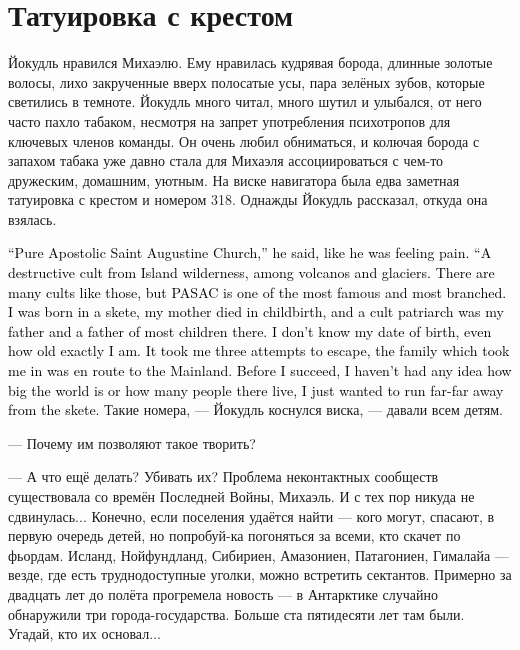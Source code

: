 \documentclass[a4paper,10pt,fleqn]{book}\usepackage{polyglossia}\setdefaultlanguage{english}\setotherlanguage{russian}\defaultfontfeatures{Ligatures=TeX,Mapping=tex-text}\usepackage{xcolor}\definecolor{lightgray}{HTML}{bbbbbb}\color{lightgray}\newcommand{\ml}[3]{\textcolor{black}{#3}}
\begin{document}
\section{Татуировка с крестом}

Йокудль нравился Михаэлю.
Ему нравилась кудрявая борода, длинные золотые волосы, лихо закрученные вверх полосатые усы, пара зелёных зубов, которые светились в темноте.
Йокудль много читал, много шутил и улыбался, от него часто пахло табаком, несмотря на запрет употребления психотропов для ключевых членов команды.
Он очень любил обниматься, и колючая борода с запахом табака уже давно стала для Михаэля ассоциироваться с чем-то дружеским, домашним, уютным.
На виске навигатора была едва заметная татуировка с крестом и номером 318.
Однажды Йокудль рассказал, откуда она взялась.

\ml{$0$}
{--- Чистоапостольская Церковь Святого Августина, --- сказал он, поморщившись, словно от боли.}
{``Pure Apostolic Saint Augustine Church,'' he said, like he was feeling pain.}
\ml{$0$}
{--- Деструктивный культ в дикой местности Исланда, среди вулканов и ледников.}
{``A destructive cult from Island wilderness, among volcanos and glaciers.}
\ml{$0$}
{Таких культов достаточно много, но ЧАСАЦ --- один из самых известных и разветвлённых.}
{There are many cults like those, but PASAC is one of the most famous and most branched.}
\ml{$0$}
{Я родился в ските, моя мать умерла при родах, а биологическим отцом был глава культа, как и у большинства родившихся там.}
{I was born in a skete, my mother died in childbirth, and a cult patriarch was my father and a father of most children there.}
\ml{$0$}
{Я не знаю, когда я родился и сколько мне в точности лет.}
{I don't know my date of birth, even how old exactly I am.}
\ml{$0$}
{Сбежал с третьей попытки --- меня приютила семья, которая направлялась на Большую Землю.}
{It took me three attempts to escape, the family which took me in was en route to the Mainland.}
\ml{$0$}
{До побега я даже не знал, что вне поселения есть целый мир и множество людей, я просто хотел убежать подальше от скита.}
{Before I succeed, I haven't had any idea how big the world is or how many people there live, I just wanted to run far-far away from the skete.}
Такие номера, --- Йокудль коснулся виска, --- давали всем детям.

--- Почему им позволяют такое творить?

--- А что ещё делать?
Убивать их?
Проблема неконтактных сообществ существовала со времён Последней Войны, Михаэль.
И с тех пор никуда не сдвинулась...
Конечно, если поселения удаётся найти --- кого могут, спасают, в первую очередь детей, но попробуй-ка погоняться за всеми, кто скачет по фьордам.
Исланд, Нойфундланд, Сибириен, Амазониен, Патагониен, Гималайа --- везде, где есть труднодоступные уголки, можно встретить сектантов.
Примерно за двадцать лет до полёта прогремела новость --- в Антарктике случайно обнаружили три города-государства.
Больше ста пятидесяти лет там были.
Угадай, кто их основал...
\end{document}
